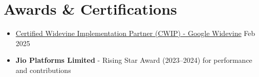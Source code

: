 \documentclass[letterpaper,11pt]{article}
\makeatletter
\newcommand{\resumeItem}[1]{
  \item{
    {#1 \vspace{-2pt}}
  }
}
\newcommand{\resumeSubheading}[4]{
  \vspace{-2pt}\item
    \begin{tabular*}{1.0\textwidth}[t]{l@{\extracolsep{\fill}}r}
      \textbf{#1} & \textbf{\small #2} \\
      \textit{\small#3} & \textit{\small #4} \\
    \end{tabular*}\vspace{-7pt}
}
\newcommand{\resumeSubItem}[1]{\resumeItem{#1}\vspace{-4pt}}
\newcommand{\resumeSubHeadingListStart}{\begin{itemize}[leftmargin=0.0in, label={}]}
\newcommand{\resumeSubHeadingListEnd}{\end{itemize}}
\newcommand{\resumeItemListStart}{\begin{itemize}}
\newcommand{\resumeItemListEnd}{\end{itemize}\vspace{-5pt}}
\makeatother
\begin{document}


        


\section{Awards \& Certifications}
  \resumeItemListStart
    \resumeItem{ \href{https://drive.google.com/file/d/1sGWLoqx3nrztlOZU5eF1V_fBKRN9QkmD/view}{Certified Widevine Implementation Partner (CWIP) - Google Widevine}} {\hfill}{Feb 2025}
    \vspace{-2mm}
    \resumeItem{\textbf{Jio Platforms Limited} - Rising Star Award (2023–2024) for performance and contributions}{}
  \resumeSubHeadingListEnd
\end{document}
